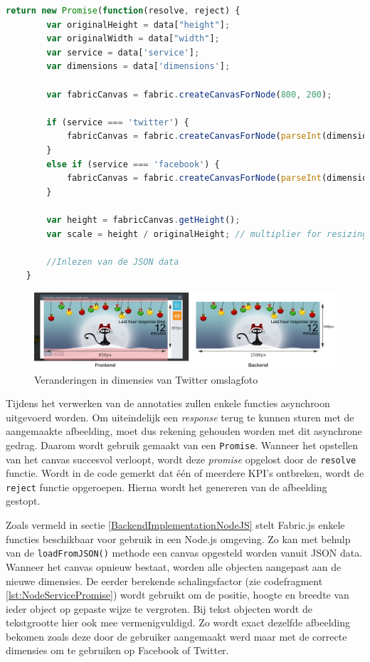 \begin{lstlisting}[caption={renderer.js - Genereren van de afbeelding},label=lst:NodeServicePromise,language=javascript]
	return new Promise(function(resolve, reject) {
		var originalHeight = data["height"];
		var originalWidth = data["width"];
		var service = data['service'];
		var dimensions = data['dimensions'];
		
		var fabricCanvas = fabric.createCanvasForNode(800, 200);
		
		if (service === 'twitter') {
			fabricCanvas = fabric.createCanvasForNode(parseInt(dimensions.width), parseInt(dimensions.height));
		}
		else if (service === 'facebook') {
			fabricCanvas = fabric.createCanvasForNode(parseInt(dimensions.width),  parseInt(dimensions.height));
		}
		
		var height = fabricCanvas.getHeight();
		var scale = height / originalHeight; // multiplier for resizing canvas + objects
		
		//Inlezen van de JSON data
	}
\end{lstlisting}

\begin{figure}[H]
	\centering
	\includegraphics[width=1\textwidth]{Figuren/FrontToBack.png}
	\caption{Veranderingen in dimensies van Twitter omslagfoto}
	\label{fig:FrontToBackend}
\end{figure} 

Tijdens het verwerken van de annotaties zullen enkele functies asynchroon uitgevoerd worden. Om uiteindelijk een \textit{response} terug te kunnen sturen met de aangemaakte afbeelding, moet dus rekening gehouden worden met dit asynchrone gedrag. Daarom wordt gebruik gemaakt van een \texttt{Promise}. Wanneer het opstellen van het canvas succesvol verloopt, wordt deze \textit{promise} opgelost door de \texttt{resolve} functie. Wordt in de code gemerkt dat \'{e}\'{e}n of meerdere KPI's ontbreken, wordt de \texttt{reject} functie opgeroepen. Hierna wordt het genereren van de afbeelding gestopt.

Zoals vermeld in sectie \ref{BackendImplementationNodeJS} stelt Fabric.js enkele functies beschikbaar voor gebruik in een Node.js omgeving. Zo kan met behulp van de \texttt{loadFromJSON()} methode een canvas opgesteld worden vanuit JSON data. Wanneer het canvas opnieuw bestaat, worden alle objecten aangepast aan de nieuwe dimensies. De eerder berekende schalingsfactor (zie codefragment \ref{lst:NodeServicePromise}) wordt gebruikt om de positie, hoogte en breedte van ieder object op gepaste wijze te vergroten. Bij tekst objecten wordt de tekstgrootte hier ook mee vermenigvuldigd. Zo wordt exact dezelfde afbeelding bekomen zoals deze door de gebruiker aangemaakt werd maar met de correcte dimensies om te gebruiken op Facebook of Twitter. 

